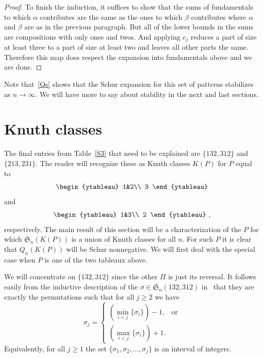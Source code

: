 \documentclass[ALCO,ThmDefs,Unicode,epreuves]{cedram}
\newcommand{\ree}[1]{\eqref{#1}}
\newcommand{\ra}{\rightarrow}
\newcommand{\al}{\alpha}
\newcommand{\be}{\beta}
\newcommand{\si}{\sigma}
\newcommand{\fS}{{\mathfrak S}}
\begin{document}
\begin{proof}
To finish the induction, it suffices to show that the sums of fundamentals to which $\al$ contributes are the same as the ones to which $\be$ contributes where $\al$ and $\be$ are as in the previous paragraph. But all of the lower bounds in the sums are compositions with only ones and twos. And applying $c_j$ reduces a part of size at least three to a part of size at least two and leaves all other parts the same. Therefore this map does respect the expansion into fundamentals above and we are done.
\end{proof}

Note that~\ree{Qs} shows that the Schur expansion for this set of patterns stabilizes as $n\ra\infty$. We will have more to say about stability in the next and last sections.


\section{Knuth classes}
\label{kc}

The final entries from Table~\ref{S3} that need to be explained are $\{132, 312\}$ and $\{213,231\}$. The reader will recognize these as Knuth classes $K(P)$ for $P$ equal to
\begin{equation}
\label{12:3}
\begin{ytableau} 1&2\\ 3 \end{ytableau}
\end{equation}
and
\begin{equation}
\label{13:2}
\begin{ytableau} 1&3\\ 2 \end{ytableau}\ ,
\end{equation}
respectively. The main result of this section will be a characterization of the $P$ for which $\fS_n(K(P))$ is a union of Knuth classes for all $n$. For such $P$ it is clear that $Q_n(K(P))$ will be Schur nonnegative. We will first deal with the special case when $P$ is one of the two tableaux above.

We will concentrate on $\{132, 312\}$ since the other $\Pi$ is just its reversal. It follows easily from the inductive description of the $\si\in\fS_n(132,312)$ in~\cite{ss:rp} that they are exactly the permutations such that for all $j\ge2$ we have 
\[
\si_j=
\begin{cases}
(\min_{i<j}\{\si_i\})-1, &\text{or}\\
(\max_{i<j}\{\si_i\})+1.
\end{cases}
\]
Equivalently, for all $j\ge1$ the set $\{\si_1,\si_2,\dots,\si_j\}$ is an interval of integers. 
\end{document}
